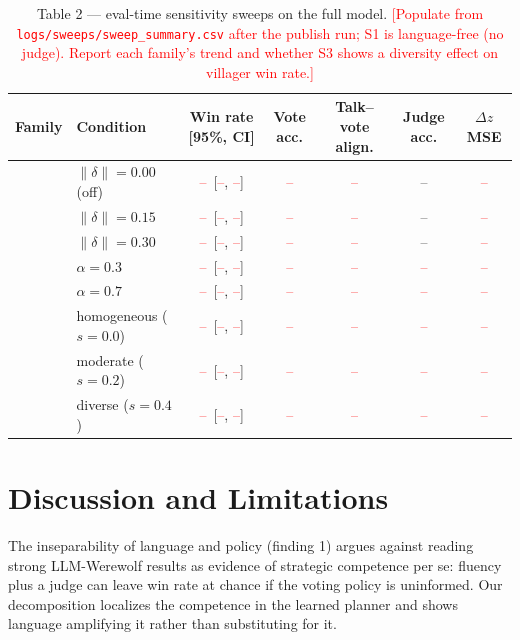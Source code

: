 \documentclass[11pt]{article}
\newcommand{\note}[1]{\textcolor{red}{[#1]}}
\newcommand{\ci}[2]{{\footnotesize [#1, #2]}}
\newcommand{\TBD}{\textcolor{red}{--}}
\begin{document}
\begin{table}[t]
\centering
\small
\begin{tabular}{llccccc}
\toprule
Family & Condition & Win rate \ci{95\%}{CI} & Vote acc. & Talk--vote align. & Judge acc. & $\Delta z$ MSE \\
\midrule
{}
  & $\lVert\delta\rVert=0.00$ (off) & \TBD\ \ci{\TBD}{\TBD} & \TBD & \TBD & --    & \TBD \\
  & $\lVert\delta\rVert=0.15$       & \TBD\ \ci{\TBD}{\TBD} & \TBD & \TBD & --    & \TBD \\
  & $\lVert\delta\rVert=0.30$       & \TBD\ \ci{\TBD}{\TBD} & \TBD & \TBD & --    & \TBD \\
\midrule
{}
  & $\alpha=0.3$ & \TBD\ \ci{\TBD}{\TBD} & \TBD & \TBD & \TBD & \TBD \\
  & $\alpha=0.7$ & \TBD\ \ci{\TBD}{\TBD} & \TBD & \TBD & \TBD & \TBD \\
\midrule
{}
  & homogeneous ($s{=}0.0$) & \TBD\ \ci{\TBD}{\TBD} & \TBD & \TBD & \TBD & \TBD \\
  & moderate ($s{=}0.2$)    & \TBD\ \ci{\TBD}{\TBD} & \TBD & \TBD & \TBD & \TBD \\
  & diverse ($s{=}0.4$)     & \TBD\ \ci{\TBD}{\TBD} & \TBD & \TBD & \TBD & \TBD \\
\bottomrule
\end{tabular}
\caption{Table 2 --- eval-time sensitivity sweeps on the full model. \note{Populate
from \texttt{logs/sweeps/sweep\_summary.csv} after the publish run; S1 is
language-free (no judge). Report each family's trend and whether S3 shows a
diversity effect on villager win rate.}}
\label{tab:table2}
\end{table}

\section{Discussion and Limitations}
\label{sec:discussion}
The inseparability of language and policy (finding 1) argues against reading
strong LLM-Werewolf results as evidence of strategic competence per se: fluency
plus a judge can leave win rate at chance if the voting policy is uninformed. Our
decomposition localizes the competence in the learned planner and shows language
amplifying it rather than substituting for it.
\end{document}
